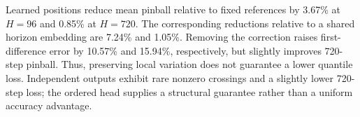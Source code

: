 Learned positions reduce mean pinball relative to fixed references by 3.67\% at $H=96$ and 0.85\% at $H=720$. The corresponding reductions relative to a shared horizon embedding are 7.24\% and 1.05\%. Removing the correction raises first-difference error by 10.57\% and 15.94\%, respectively, but slightly improves 720-step pinball. Thus, preserving local variation does not guarantee a lower quantile loss. Independent outputs exhibit rare nonzero crossings and a slightly lower 720-step loss; the ordered head supplies a structural guarantee rather than a uniform accuracy advantage.
